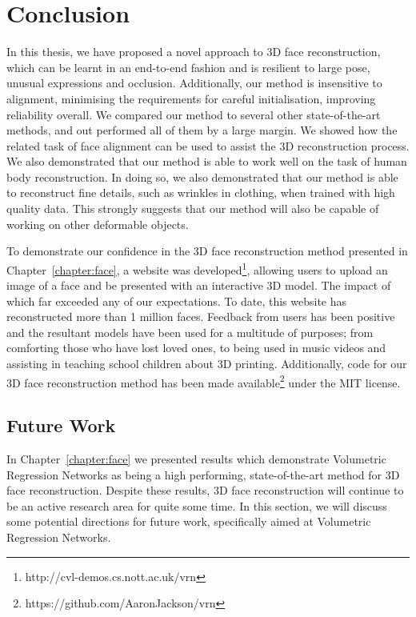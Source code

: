 \chapter{Conclusion}
\label{chapter:conclusion}



In this thesis, we have proposed a novel approach to 3D face
reconstruction, which can be learnt in an end-to-end fashion and is
resilient to large pose, unusual expressions and
occlusion. Additionally, our method is insensitive to alignment,
minimising the requirements for careful initialisation, improving
reliability overall. We compared our method to several other
state-of-the-art methods, and out performed all of them by a large
margin. We showed how the related task of face alignment can be used
to assist the 3D reconstruction process. We also demonstrated that our
method is able to work well on the task of human body
reconstruction. In doing so, we also demonstrated that our method is
able to reconstruct fine details, such as wrinkles in clothing, when
trained with high quality data. This strongly suggests that our method
will also be capable of working on other deformable objects.

To demonstrate our confidence in the 3D face reconstruction method
presented in Chapter~\ref{chapter:face}, a website was
developed\footnote{http://cvl-demos.cs.nott.ac.uk/vrn}, allowing users
to upload an image of a face and be presented with an interactive 3D
model. The impact of which far exceeded any of our expectations. To
date, this website has reconstructed more than 1 million
faces. Feedback from users has been positive and the resultant models
have been used for a multitude of purposes; from comforting those who
have lost loved ones, to being used in music videos and assisting in
teaching school children about 3D printing. Additionally, code for our
3D face reconstruction method has been made
available\footnote{https://github.com/AaronJackson/vrn} under the MIT
license.

\section{Future Work}

In Chapter~\ref{chapter:face} we presented results which demonstrate
Volumetric Regression Networks as being a high performing,
state-of-the-art method for 3D face reconstruction. Despite these
results, 3D face reconstruction will continue to be an active research
area for quite some time. In this section, we will discuss some
potential directions for future work, specifically aimed at Volumetric
Regression Networks.

